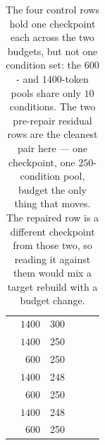 \begin{table}[htbp]
  \caption{ The four control rows hold one checkpoint each across
  the two budgets, but not one condition set: the $600$- and $1400$-token pools
  share only $\num{10}$ conditions. The two pre-repair residual rows are the
  cleanest pair here --- one checkpoint, one $\num{250}$-condition pool, budget the
  only thing that moves. The repaired row is a different checkpoint from those two,
  so reading it against them would mix a target rebuild with a budget change.}
  \label{tab:budget-arms}
  \begin{fullwidth}
  \begin{threeparttable}
  \begin{tabularx}{\linewidth}{@{}L{35mm} r r Y Y Y@{}}
   &  & 
    &  &  &  \\
  \midrule
   & $1400$ & \num{300}
    & 
    & 
    &  \\
   & $1400$ & \num{250}
    & 
    & 
    &  \\
   & $600$ & \num{250}
    & 
    & 
    &  \\
  \addlinespace[10pt]
   & $1400$ & \num{248}
    & 
    & 
    &  \\
   & $600$ & \num{250}
    & 
    & 
    &  \\
  \addlinespace[10pt]
   & $1400$ & \num{248}
    & 
    & 
    &  \\
   & $600$ & \num{250}
    & 
    & 
    &  \\

\end{tabularx}
\end{threeparttable}
\end{fullwidth}
\end{table}

